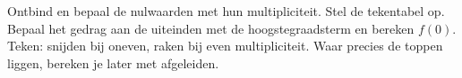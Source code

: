 \begin{werkwijze}
Ontbind en bepaal de nulwaarden met hun multipliciteit. Stel de tekentabel op. Bepaal het gedrag aan de uiteinden met de hoogstegraadsterm en bereken $f(0)$. Teken: snijden bij oneven, raken bij even multipliciteit. Waar precies de toppen liggen, bereken je later met afgeleiden.
\end{werkwijze}

\begin{oefeningen}

\end{oefeningen}

\opdrachtenkop

\begin{oefeningen}


























\end{oefeningen}

